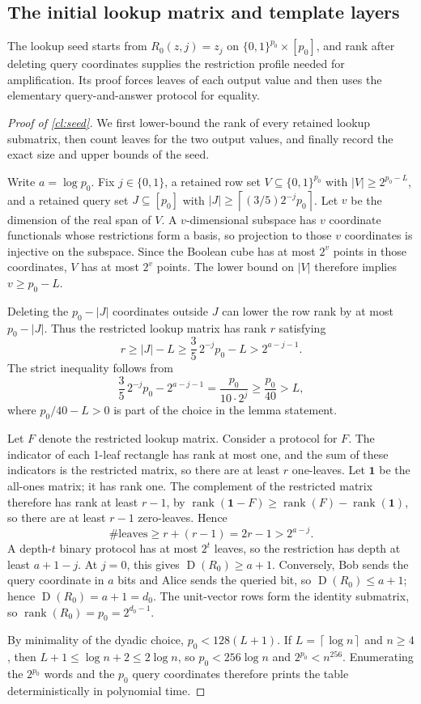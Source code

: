 \documentclass[11pt]{article} \usepackage[utf8]{inputenc}
\theoremstyle{plain} \newtheorem{theorem}{Theorem}[section]
\theoremstyle{definition} \newaliascnt{definition}{theorem}
\newcommand{\D}{\operatorname{D}}
\newcommand{\card}[1]{\lvert#1\rvert}
\newcommand{\ceil}[1]{\left\lceil#1\right\rceil}
\DeclareMathOperator{\rank}{rank} \crefname{claim}{Claim}{Claims}
\begin{document}
\subsection{The initial lookup matrix and template layers}

The lookup seed starts from $R_0(z,j)=z_j$ on $\{0,1\}^{p_0}\times[p_0]$, and
rank after deleting query coordinates supplies the restriction profile needed
for amplification. Its proof forces leaves of each output value and then uses
the elementary query-and-answer protocol for equality.

\begin{proof}[Proof of \cref{cl:seed}]
We first lower-bound the rank of every retained lookup submatrix, then count
leaves for the two output values, and finally record the exact size and upper
bounds of the seed.

Write \(a=\log p_0\). Fix \(j\in\{0,1\}\), a retained row set
\(V\subseteq\{0,1\}^{p_0}\) with \(\card V\ge2^{p_0-L}\), and a retained query
set \(J\subseteq[p_0]\) with \(\card J\ge\ceil{(3/5)2^{-j}p_0}\). Let \(v\) be
the dimension of the real span of \(V\). A \(v\)-dimensional subspace has \(v\)
coordinate functionals whose restrictions form a basis, so projection to those
\(v\) coordinates is injective on the subspace. Since the Boolean cube has at
most \(2^v\) points in those coordinates, \(V\) has at most \(2^v\) points. The
lower bound on \(\card V\) therefore implies \(v\ge p_0-L\).

Deleting the \(p_0-\card J\) coordinates outside \(J\) can lower the row rank by
at most \(p_0-\card J\). Thus the restricted lookup matrix has rank \(r\)
satisfying
\[
r\ge \card J-L \ge \frac35\,2^{-j}p_0-L >2^{a-j-1}.
\]
The strict inequality follows from
\[
\frac35\,2^{-j}p_0-2^{a-j-1} =\frac{p_0}{10\cdot2^j}\ge\frac{p_0}{40}>L,
\]
where \(p_0/40-L>0\) is part of the choice in the lemma statement.

Let \(F\) denote the restricted lookup matrix. Consider a protocol for \(F\).
The indicator of each 1-leaf rectangle has rank at most one, and the sum of
these indicators is the restricted matrix, so there are at least \(r\)
one-leaves. Let \(\mathbf1\) be the all-ones matrix; it has rank one. The
complement of the restricted matrix therefore has rank at least \(r-1\), by
\(\rank(\mathbf 1-F)\ge\rank(F)-\rank(\mathbf1)\), so there are at least \(r-1\)
zero-leaves. Hence
\[
\#\text{leaves}\ge r+(r-1)=2r-1>2^{a-j}.
\]
A depth-\(t\) binary protocol has at most \(2^t\) leaves, so the restriction has
depth at least \(a+1-j\). At \(j=0\), this gives \(\D(R_0)\ge a+1\). Conversely,
Bob sends the query coordinate in \(a\) bits and Alice sends the queried bit, so
\(\D(R_0)\le a+1\); hence \(\D(R_0)=a+1=d_0\). The unit-vector rows form the
identity submatrix, so \(\rank(R_0)=p_0=2^{d_0-1}\).

By minimality of the dyadic choice, \(p_0<128(L+1)\). If \(L=\ceil{\log n}\) and
\(n\ge4\), then \(L+1\le\log n+2\le2\log n\), so \(p_0<256\log n\) and
\(2^{p_0}<n^{256}\). Enumerating the \(2^{p_0}\) words and the \(p_0\) query
coordinates therefore prints the table deterministically in polynomial time.
\end{proof}
\end{document}
